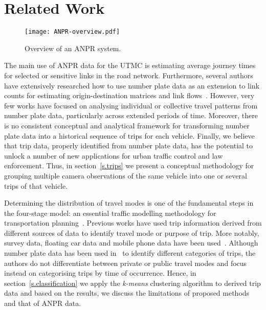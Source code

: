 \section{Related Work}
\label{s.related}

\begin{figure}[t]
\centering
\texttt{[image: ANPR-overview.pdf]}
\caption{Overview of an ANPR system.}
\label{fig:anpr-overview}
\vspace{-0.6cm}
\end{figure}

The main use of ANPR data for the UTMC is estimating average journey times for selected or sensitive links in the road network. Furthermore, several authors have extensively researched how to use number plate data as an extension to link counts for estimating origin-destination matrices and link flows~\cite{Castillo2010, Castillo2008, Hazelton2012}. However, very few works have focused on analysing individual or collective travel patterns from number plate data, particularly across extended periods of time. Moreover, there is no consistent conceptual and analytical framework for transforming number plate data into a historical sequence of trips for each vehicle. Finally, we believe that trip data, properly identified from number plate data, has the potential to unlock a number of new applications for urban traffic control and law enforcement. Thus, in section~\ref{s.trips} we present a conceptual methodology for grouping multiple camera observations of the same vehicle into one or several trips of that vehicle.

Determining the distribution of travel modes is one of the fundamental steps in the four-stage model: an essential traffic modelling methodology for transportation planning~\cite{FourStepModel}. Previous works have used trip information derived from different sources of data to identify travel mode or purpose of trip. More notably, survey data, floating car data and mobile phone data have been used~\cite{ODMobileData, ClusteringGPS}.  Although number plate data has been used in~\cite{Clustering} to identify different categories of trips, the authors do not differentiate between private or public travel modes and focus instead on categorising trips by time of occurrence. Hence, in section~\ref{s.classification} we apply the \emph{k-means} clustering algorithm to derived trip data and based on the results, we discuss the limitations of proposed methods and that of ANPR data.


